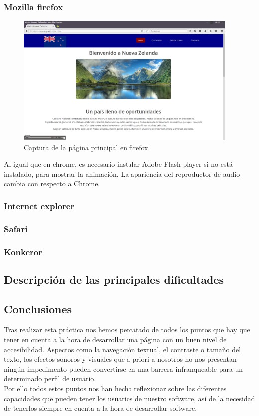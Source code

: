 \subsubsection{Mozilla firefox}
\begin{figure}[h]
	\centering
	\includegraphics[width=0.95\textwidth]{./Fotos/firefox-capture.png}
	\caption{Captura de la página principal en firefox}
	\label{fig: ejemplo}
\end{figure}
Al igual que en chrome, es necesario instalar Adobe Flash player si no está instalado, para mostrar la animación. La apariencia del reproductor de audio cambia con respecto a Chrome.
\subsubsection{Internet explorer}
\subsubsection{Safari}
\subsubsection{Konkeror}
\subsection{Descripción de las principales dificultades}
\subsection{Conclusiones}
Tras realizar esta práctica nos hemos percatado de todos los puntos que hay que tener en cuenta a la hora de desarrollar una página con un buen nivel de accesibilidad. Aspectos como la navegación textual, el contraste o tamaño del texto, los efectos sonoros y visuales que a priori a nosotros no nos presentan ningún impedimento pueden convertirse en una barrera infranqueable para un determinado perfil de usuario.\\
Por ello todos estos puntos nos han hecho reflexionar sobre las diferentes capacidades que pueden tener los usuarios de nuestro software, así de la necesidad de tenerlos siempre en cuenta a la hora de desarrollar software.